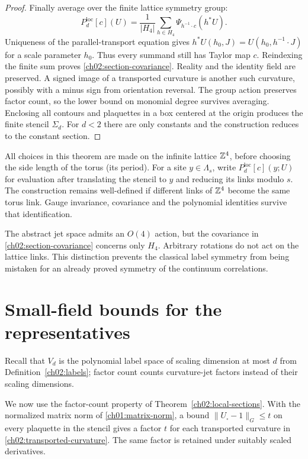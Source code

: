 \begin{proof}
Finally average over the finite lattice symmetry group:
\begin{equation}
 P_d^{\mathrm{loc}}[c](U)
   =\frac1{|H_4|}\sum_{h\in H_4}\Psi_{h^{-1}\cdot c}(h^*U).
 \label{ch02:section-average}
\end{equation}
Uniqueness of the parallel-transport equation gives
$h^*U(h_0,J)=U(h_0,h^{-1}\cdot J)$ for a scale parameter $h_0$.
Thus every summand still has Taylor map $c$. Reindexing the finite sum
proves \eqref{ch02:section-covariance}. Reality and the identity field are preserved.
A signed image of a transported curvature is another such curvature,
possibly with a minus sign from orientation reversal. The group action
preserves factor count, so the lower bound on monomial degree survives
averaging. Enclosing all contours and plaquettes in a box centered at the origin produces
the finite stencil $\Sigma_d$.
For $d<2$ there are only constants and the construction reduces to the
constant section.
\end{proof}

All choices in this theorem are made on the infinite lattice $\mathbb Z^4$,
before choosing the side length of the torus (its period). For a site $y\in\Lambda_s$, write
$P_d^{\mathrm{loc}}[c](y;U)$ for evaluation after translating the stencil
to $y$ and reducing its links modulo $s$. The construction remains
well-defined if different links of $\mathbb Z^4$ become the same torus link.
Gauge invariance, covariance and the polynomial identities survive that
identification.

The abstract jet space admits an $O(4)$ action, but the covariance in
\eqref{ch02:section-covariance} concerns only $H_4$. Arbitrary rotations do
not act on the lattice links. This distinction prevents the classical
label symmetry from being mistaken for an already proved symmetry of the
continuum correlations.

\section{Small-field bounds for the representatives}
\label{ch02:bounds}

Recall that $V_d$ is the polynomial label space of scaling dimension at most $d$ from Definition~\ref{ch02:labels}; factor count counts curvature-jet factors instead of their scaling dimensions.

We now use the factor-count property of
Theorem~\ref{ch02:local-sections}. With the normalized matrix norm of
\eqref{ch01:matrix-norm}, a bound $\|U_\square-1\|_G\le t$ on every
plaquette in the stencil gives a factor
$t$ for each transported curvature in \eqref{ch02:transported-curvature}.
The same factor is retained under suitably scaled derivatives.

